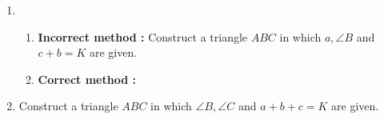 \begin{enumerate}[label=\thesection.\arabic*,ref=\thesection.\theenumi]
\item
	\begin{enumerate}
		\item	\textbf{Incorrect method :}
	Construct a triangle $ABC$ in which $a, \angle{B}$ and $c + b  = K$ are given.
\label{cons/tri/1}
	\\
	\solution 

	\item	\textbf{Correct method :}
		
	\end{enumerate}
%
\iffalse
\item 
\label{cons/tri/2}

%
\item 
\label{cons/tri/3}

%
\item 
\label{cons/tri/5}

\fi
%
\item Construct a triangle $ABC$ in which $\angle{B}, \angle{C}$ and  $a+b+c=K$ are given.
\label{cons/tri/4}
\\
\solution



\end{enumerate}
